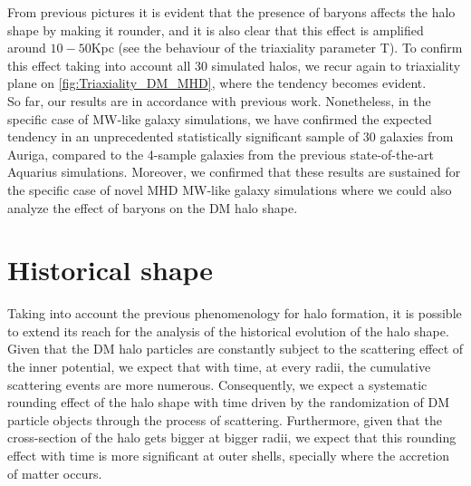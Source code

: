 From previous pictures it is evident that the presence of baryons affects the halo shape by making it rounder, and it is also clear that this effect is amplified around $10-50$Kpc (see the behaviour of the triaxiality parameter T). To confirm this effect taking into account all 30 simulated halos, we recur again to triaxiality plane on \ref{fig:Triaxiality_DM_MHD}, where the tendency becomes evident.\\

So far, our results are in accordance with previous work. Nonetheless, in the specific case of MW-like galaxy simulations, we have confirmed the expected tendency in an unprecedented statistically significant sample of 30 galaxies from Auriga, compared to the 4-sample galaxies from the previous state-of-the-art Aquarius simulations. Moreover, we confirmed that these results are sustained for the specific case of novel MHD MW-like galaxy simulations where we could also analyze the effect of baryons on the DM halo shape.\\

\section{Historical shape}
Taking into account the previous phenomenology for halo formation, it is possible to extend 
its reach for the analysis of the historical evolution of the halo shape.\\

Given that the DM halo particles are constantly subject to the scattering effect of the inner potential, we expect that with time, at every radii, the cumulative scattering events are more numerous. Consequently, we expect a systematic rounding effect of the halo shape with time driven by the randomization of DM particle objects through the process of scattering. Furthermore, given that the cross-section of the halo gets bigger at bigger radii, we expect that this rounding effect with time is more significant at outer shells, specially where the accretion of matter occurs.\\

 

